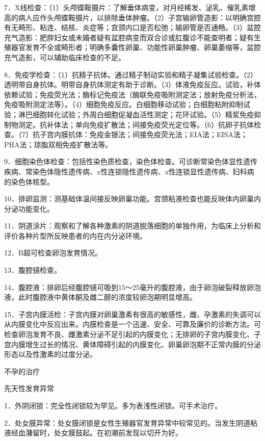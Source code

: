 \documentclass[12pt,UTF8,openany]{ctexbook}
\begin{document}
7．X线检查：（1）头颅蝶鞍摄片：了解垂体病变，对月经稀发、泌乳、催乳素增高的病人应作头颅蝶鞍摄片，以排除垂体肿瘤。（2）子宫输卵管造影：以明确宫腔有无畸形、粘连、结核、炎症等；宫颈内口是否松弛；输卵管是否通畅。（3）盆腔充气造影：肥胖妇女或未婚者疑有盆腔病变而双合诊或肛腹诊不能查明者；疑有生殖器官发育不全或畸形者；明确多囊性卵巢、功能性卵巢肿瘤、卵巢萎缩等，盆腔充气造影，可以辅助临床检查的不足。

8．免疫学检查：（1）抗精子抗体。通过精子制动实验和精子凝集试验检查。（2）透明带自身抗体。明带自身抗体测定有助于诊断。（3）体液免疫反应。试验，补体依赖试验；免疫荧光法；酶标记免疫法（酶联免疫吸附测定法；放射免疫分析法，免疫吸附测定法等）。（4）细胞免疫反应。白细胞移动试验；白细胞粘附抑制试验；淋巴细胞转化试验；外周白细胞促凝血活性测定；花环试验。（5）精浆免疫抑制物测定。抗补体法；单向免疫扩散法；间接免疫荧光定位等。（6）抗卵子抗体检查。（7）抗子宫内膜抗体：免疫金银法；间接免疫荧光法；EIA法；EISA法；PHA法；琼脂双相免疫扩散法等。

9．细胞染色体检查：包括性染色质检查，染色体检查。可诊断常染色体显性遗传疾病、常染色体隐性遗传病、x性连锁隐性遗传病、x性连锁显性遗传病、妇科病的染色体核型。

10．排卵监测：测基础体温间接反映卵巢功能。宫颈粘液检查也能反映体内卵巢内分泌功能变化。

11．阴道涂片：观察和了解各种激素的阴道脱落细胞的单独作用，为临床上分析和评价各种片型所反映患者的内在内分泌环境。

12．B超可检查卵泡发育情况。

13．腹腔镜检查。

14．腹腔液：排卵后经腹腔镜可吸到15～25毫升的腹腔液，由于卵泡破裂释放卵泡液，此时腹腔液中黄体酮及雌二醇的浓度较卵泡期明显增高。

15．子宫内膜活检：子宫内膜对卵巢激素有很高的敏感性，雌、孕激素的失调可以从内膜变化中反应出来。内膜检查是一个迅速、安全、可靠及廉价的诊断方法。可检查卵泡发育不良、雌激素分泌不足引起的内膜变化；无排卵的子宫内膜变化、子宫内膜增生过长的情况、黄体障碍引起的内膜变化、卵巢卵泡期不正常内膜的分泌形态以及性激素的过度分泌。





不孕的治疗


先天性发育异常

1．外阴闭锁：完全性闭锁较为罕见。多为表浅性闭锁。可手术治疗。

2．处女膜异常：处女膜闭锁是女性生殖器官发育异常中较常见的。当发生阴道粘液经血潴留时，处女膜鼓起。在初潮前发现以切开为好。
\end{document}
